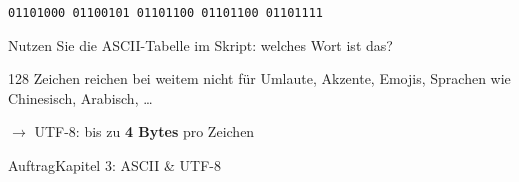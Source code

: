 \begin{frame}[fragile]
\begin{center}
\texttt{01101000 01100101 01101100 01101100 01101111}
\end{center}
\begin{center}
Nutzen Sie die ASCII-Tabelle im Skript: welches Wort ist das?
\end{center}
\end{frame}

\begin{frame}
\begin{center}
128 Zeichen reichen bei weitem nicht für Umlaute, Akzente, Emojis, Sprachen wie Chinesisch, Arabisch, \ldots
\end{center}
\vspace{4mm}
\begin{center}
$\rightarrow$ \gls{UTF-8}: bis zu \textbf{4 Bytes} pro Zeichen
\end{center}
\end{frame}

\begin{frame}{Auftrag}{Kapitel 3: ASCII \& UTF-8}
\vspace{3mm}
\vspace{3mm}
\end{frame}

